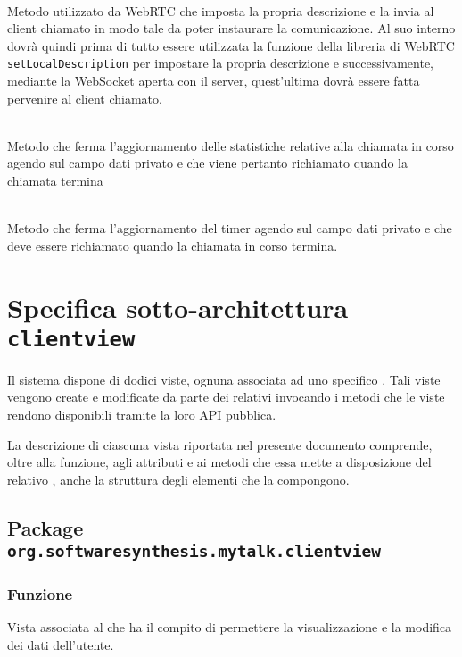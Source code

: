 \begin{description}
  \item{}\\
  Metodo utilizzato da WebRTC che imposta la propria descrizione e la invia al client chiamato in modo tale da poter instaurare la comunicazione. Al suo interno dovrà quindi prima di tutto essere utilizzata la funzione della libreria di WebRTC \verb'setLocalDescription' per impostare la propria descrizione e successivamente, mediante la WebSocket aperta con il server, quest'ultima dovrà essere fatta pervenire al client  chiamato.

  \item{}\\
  Metodo che ferma l'aggiornamento delle statistiche relative alla chiamata in corso agendo sul campo dati privato  e che viene pertanto richiamato quando la chiamata termina

  \item{}\\
  Metodo che ferma l'aggiornamento del timer agendo sul campo dati privato  e che deve essere richiamato quando la chiamata in corso termina.

\end{description}

\clearpage

\section{Specifica sotto-architettura \texttt{clientview}}\label{sec:clientviewarchitecture}
Il sistema dispone di dodici viste, ognuna associata ad uno specifico . Tali viste vengono create e modificate da parte dei relativi  invocando i metodi che le viste rendono disponibili tramite la loro API pubblica.

La descrizione di ciascuna vista riportata nel presente documento comprende, oltre alla funzione, agli attributi e ai metodi che essa mette a disposizione del relativo , anche la struttura degli elementi che la compongono.

\subsection{Package \texttt{org.softwaresynthesis.mytalk.clientview}}

\subsubsection*{Funzione}
Vista associata al   che ha il compito di permettere la visualizzazione e la modifica dei dati dell'utente.

